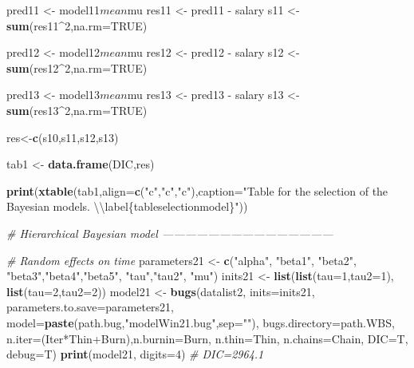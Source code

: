\documentclass[]{article}
\newenvironment{Shaded}{\begin{snugshade}}{\end{snugshade}}
\newcommand{\KeywordTok}[1]{\textcolor[rgb]{0.13,0.29,0.53}{\textbf{{#1}}}}
\newcommand{\DataTypeTok}[1]{\textcolor[rgb]{0.13,0.29,0.53}{{#1}}}
\newcommand{\DecValTok}[1]{\textcolor[rgb]{0.00,0.00,0.81}{{#1}}}
\newcommand{\CharTok}[1]{\textcolor[rgb]{0.31,0.60,0.02}{{#1}}}
\newcommand{\StringTok}[1]{\textcolor[rgb]{0.31,0.60,0.02}{{#1}}}
\newcommand{\CommentTok}[1]{\textcolor[rgb]{0.56,0.35,0.01}{\textit{{#1}}}}
\newcommand{\OtherTok}[1]{\textcolor[rgb]{0.56,0.35,0.01}{{#1}}}
\newcommand{\NormalTok}[1]{{#1}}
\begin{document}
\begin{Shaded}
\begin{Highlighting}[]
{{\NormalTok{pred11 <-}\StringTok{ }\NormalTok{model11$mean$mu}
\NormalTok{res11 <-}\StringTok{ }\NormalTok{pred11 -}\StringTok{ }\NormalTok{salary}
\NormalTok{s11 <-}\StringTok{ }\KeywordTok{sum}\NormalTok{(res11^}\DecValTok{2}\NormalTok{,}\DataTypeTok{na.rm=}\OtherTok{TRUE}\NormalTok{)}

\NormalTok{pred12 <-}\StringTok{ }\NormalTok{model12$mean$mu}
\NormalTok{res12 <-}\StringTok{ }\NormalTok{pred12 -}\StringTok{ }\NormalTok{salary}
\NormalTok{s12 <-}\StringTok{ }\KeywordTok{sum}\NormalTok{(res12^}\DecValTok{2}\NormalTok{,}\DataTypeTok{na.rm=}\OtherTok{TRUE}\NormalTok{)}

\NormalTok{pred13 <-}\StringTok{ }\NormalTok{model13$mean$mu}
\NormalTok{res13 <-}\StringTok{ }\NormalTok{pred13 -}\StringTok{ }\NormalTok{salary}
\NormalTok{s13 <-}\StringTok{ }\KeywordTok{sum}\NormalTok{(res13^}\DecValTok{2}\NormalTok{,}\DataTypeTok{na.rm=}\OtherTok{TRUE}\NormalTok{)}

\NormalTok{res<-}\KeywordTok{c}\NormalTok{(s10,s11,s12,s13)}

\NormalTok{tab1 <-}\StringTok{ }\KeywordTok{data.frame}\NormalTok{(DIC,res)}

\KeywordTok{print}\NormalTok{(}\KeywordTok{xtable}\NormalTok{(tab1,}\DataTypeTok{align=}\KeywordTok{c}\NormalTok{(}\StringTok{"c"}\NormalTok{,}\StringTok{"c"}\NormalTok{,}\StringTok{"c"}\NormalTok{),}\DataTypeTok{caption=}\StringTok{"Table for the selection of the Bayesian models. }
\StringTok{             }\CharTok{\textbackslash{}\textbackslash{}}\StringTok{label\{tableselectionmodel\}"}\NormalTok{))}


\CommentTok{# Hierarchical Bayesian model ---------------------------------------------}

\CommentTok{# Random effects on time}
\NormalTok{parameters21 <-}\StringTok{ }\KeywordTok{c}\NormalTok{(}\StringTok{"alpha"}\NormalTok{, }\StringTok{"beta1"}\NormalTok{, }\StringTok{"beta2"}\NormalTok{, }\StringTok{"beta3"}\NormalTok{,}\StringTok{"beta4"}\NormalTok{,}\StringTok{"beta5"}\NormalTok{, }\StringTok{"tau"}\NormalTok{,}\StringTok{"tau2"}\NormalTok{, }\StringTok{"mu"}\NormalTok{)}
\NormalTok{inits21 <-}\StringTok{ }\KeywordTok{list}\NormalTok{(}\KeywordTok{list}\NormalTok{(}\DataTypeTok{tau=}\DecValTok{1}\NormalTok{,}\DataTypeTok{tau2=}\DecValTok{1}\NormalTok{), }\KeywordTok{list}\NormalTok{(}\DataTypeTok{tau=}\DecValTok{2}\NormalTok{,}\DataTypeTok{tau2=}\DecValTok{2}\NormalTok{))}
\NormalTok{model21 <-}\StringTok{ }\KeywordTok{bugs}\NormalTok{(datalist2, }\DataTypeTok{inits=}\NormalTok{inits21, }\DataTypeTok{parameters.to.save=}\NormalTok{parameters21,}
               \DataTypeTok{model=}\KeywordTok{paste}\NormalTok{(path.bug,}\StringTok{"modelWin21.bug"}\NormalTok{,}\DataTypeTok{sep=}\StringTok{""}\NormalTok{),}
               \DataTypeTok{bugs.directory=}\NormalTok{path.WBS,               }
               \DataTypeTok{n.iter=}\NormalTok{(Iter*Thin+Burn),}\DataTypeTok{n.burnin=}\NormalTok{Burn, }\DataTypeTok{n.thin=}\NormalTok{Thin, }\DataTypeTok{n.chains=}\NormalTok{Chain, }\DataTypeTok{DIC=}\NormalTok{T, }\DataTypeTok{debug=}\NormalTok{T)}
\KeywordTok{print}\NormalTok{(model21, }\DataTypeTok{digits=}\DecValTok{4}\NormalTok{) }
\CommentTok{# DIC=2964.1}

}}
\end{Highlighting}
\end{Shaded}
\end{document}

